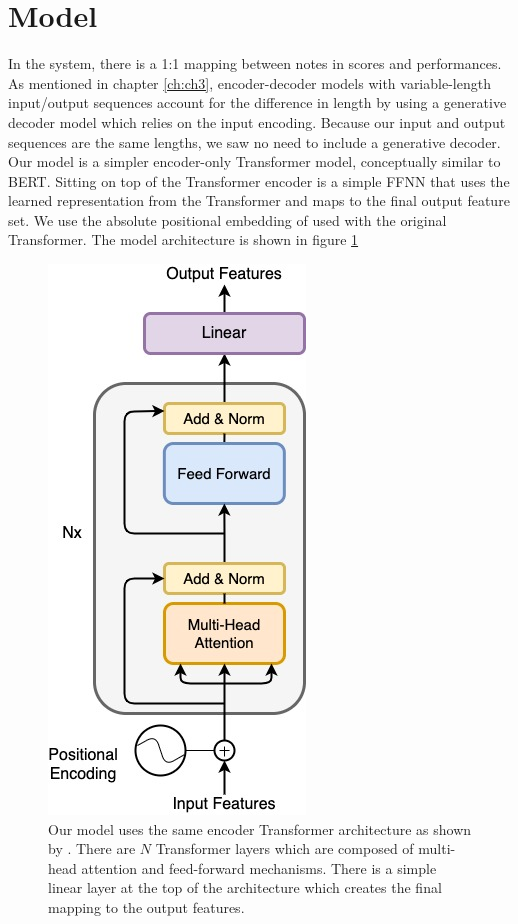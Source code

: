 \section{Model}
In the \vnet{} system, there is a 1:1 mapping between notes in scores and performances. As mentioned in chapter \ref{ch:ch3}, encoder-decoder \seq{} models with variable-length input/output sequences account for the difference in length by using a generative decoder model which relies on the input encoding. Because our input and output sequences are the same lengths, we saw no need to include a generative decoder. Our model is a simpler encoder-only Transformer model, conceptually similar to BERT. Sitting on top of the Transformer encoder is a simple FFNN that uses the learned representation from the Transformer and maps to the final output feature set. We use the absolute positional embedding of \citet{vaswani2017attention} used with the original Transformer. The model architecture is shown in figure \ref{fig:model_architecture}

\begin{figure}
    \centering
    \includegraphics[width=0.5\linewidth]{figs/ch5/model_architecture.jpg}
    \caption{Our model uses the same encoder Transformer architecture as shown by \citet{vaswani2017attention}. There are $N$ Transformer layers which are composed of multi-head attention and feed-forward mechanisms. There is a simple linear layer at the top of the architecture which creates the final mapping to the output features.}
    \label{fig:model_architecture}
\end{figure}

